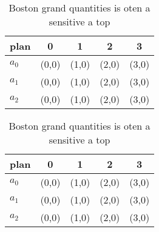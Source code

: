 \documentclass[a4paper]{article}
\begin{document}
\begin{table}
\begin{adjustbox}{width=0.5\columnwidth}
\begin{tabular}{|l|l|l|l|l|}
\hline
\textbf{plan} & \multicolumn{1}{c|}{\textbf{0}} & \multicolumn{1}{c|}{\textbf{1}} & \multicolumn{1}{c|}{\textbf{2}} & \multicolumn{1}{c|}{\textbf{3}} \\ \hline
\textbf{$a_0$}  & (0,0) & (1,0) & (2,0) & (3,0) \\ \hline
\textbf{$a_1$}  & (0,0) & (1,0) & (2,0) & (3,0) \\ \hline
\textbf{$a_2$}  & (0,0) & (1,0) & (2,0) & (3,0) \\ \hline
\end{tabular}
\end{adjustbox}
\caption{Boston grand quantities is oten a sensitive a top
}
\end{table}

\begin{table}
\begin{adjustbox}{width=0.5\columnwidth}
\begin{tabular}{|l|l|l|l|l|}
\hline
\textbf{plan} & \multicolumn{1}{c|}{\textbf{0}} & \multicolumn{1}{c|}{\textbf{1}} & \multicolumn{1}{c|}{\textbf{2}} & \multicolumn{1}{c|}{\textbf{3}} \\ \hline
\textbf{$a_0$}  & (0,0) & (1,0) & (2,0) & (3,0) \\ \hline
\textbf{$a_1$}  & (0,0) & (1,0) & (2,0) & (3,0) \\ \hline
\textbf{$a_2$}  & (0,0) & (1,0) & (2,0) & (3,0) \\ \hline
\end{tabular}
\end{adjustbox}
\caption{Boston grand quantities is oten a sensitive a top
}
\end{table}
\end{document}
